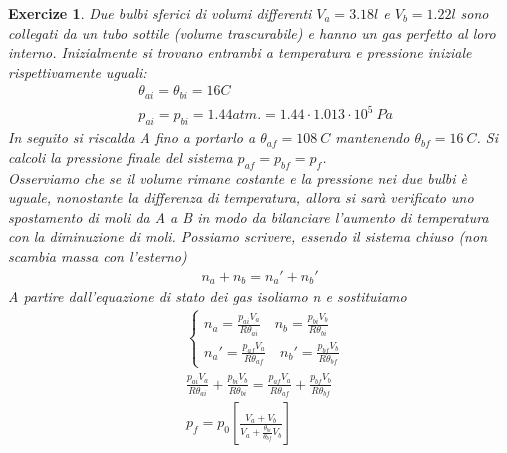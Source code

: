 \documentclass[10pt,a4paper]{article}
\newtheorem{exercize}{Exercize}
\begin{document}
\begin{exercize}
Due bulbi sferici di volumi differenti $V_a = 3.18 l$ e $V_b = 1.22 l$ sono collegati da un tubo sottile (volume trascurabile) e hanno un gas perfetto al loro interno. Inizialmente si trovano entrambi a temperatura e pressione iniziale rispettivamente uguali:
\begin{align*}
&\theta_{ai} = \theta_{bi} = 16 C\\
&p_{ai} = p_{bi} = 1.44 atm. = 1.44\cdot 1.013 \cdot 10^5\ Pa
\end{align*} 
In seguito si riscalda A fino a portarlo a $\theta_{af} = 108\ C$ mantenendo $\theta_{bf} = 16\ C$. Si calcoli la pressione finale del sistema $p_{af}=p_{bf}=p_f$.\\
Osserviamo che se il volume rimane costante e la pressione nei due bulbi è uguale, nonostante la differenza di temperatura, allora si sarà verificato uno spostamento di moli da A a B in modo da bilanciare l'aumento di temperatura con la diminuzione di moli. Possiamo scrivere, essendo il sistema chiuso (non scambia massa con l'esterno)
\begin{align*}
	n_a + n_b = n_a' + n_b'
\end{align*}
A partire dall'equazione di stato dei gas isoliamo n e sostituiamo
\begin{align*}
	&\begin{cases}
	n_a = \frac{p_{ai} V_a}{R \theta_{ai}} \quad n_b = \frac{p_{bi} V_b}{R \theta_{bi}}\\
	n_a' = \frac{p_{af}V_a}{R \theta_{af}} \quad n_b'= \frac{p_{bf}V_b}{R \theta_{bf}}
	\end{cases}\\
	&\frac{p_{ai}V_a}{R \theta_{ai}} + \frac{p_{bi} V_b}{R \theta_{bi}} = \frac{p_{af}V_a}{R \theta_{af}} + \frac{p_{bf}V_b}{R \theta_{bf}}\\
	&p_f = p_0\left[\frac{V_a + V_b}{V_a + \frac{\theta_{bi}}{\theta_{bf}} V_b}\right]
\end{align*}
\end{exercize}
\end{document}
